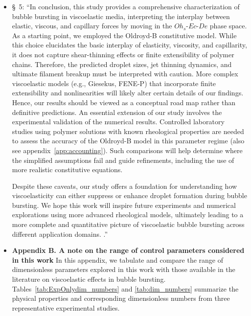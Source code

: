 \documentclass[]{article}
\newcommand{\oo}{\color{magenta} \normalfont}
\newcommand{\bb}{\color{black} \normalfont}
\begin{document}
\begin{enumerate}
\begin{enumerate}
\begin{itemize}
        \item \S~5: ``In conclusion, this study provides a comprehensive characterization of bubble bursting in viscoelastic media, interpreting the interplay between elastic, viscous, and capillary forces by moving in the $Oh_s$-$Ec$-$De$ phase space. 
        \oo
        As a starting point, we employed the Oldroyd-B constitutive model. While this choice elucidates the basic interplay of elasticity, viscosity, and capillarity, it does not capture shear-thinning effects or finite extensibility of polymer chains. Therefore, the predicted droplet sizes, jet thinning dynamics, and ultimate filament breakup must be interpreted with caution. More complex viscoelastic models (e.g., Giesekus, FENE-P) that incorporate finite extensibility and nonlinearities will likely alter certain details of our findings. Hence, our results should be viewed as a conceptual road map rather than definitive predictions. 
        An essential extension of our study involves the experimental validation of the numerical results. Controlled laboratory studies using polymer solutions with known rheological properties are needed to assess the accuracy of the Oldroyd-B model in this parameter regime (also see appendix~\ref{app:accounting}). Such comparisons will help determine where the simplified assumptions fail and guide refinements, including the use of more realistic constitutive equations.
        
        Despite these caveats, our study offers a foundation for understanding how viscoelasticity can either suppress or enhance droplet formation during bubble bursting. We hope this work will inspire future experiments and numerical explorations using more advanced rheological models, ultimately leading to a more complete and quantitative picture of viscoelastic bubble bursting across different application domains.
        \bb.''

        \item \oo
        \textbf{Appendix B. A note on the range of control parameters considered in this work}
        In this appendix, we tabulate and compare the range of dimensionless parameters explored in this work with those available in the literature on viscoelastic effects in bubble bursting. Tables~\ref{tab:ExpOnlydim_numbers} and \ref{tab:dim_numbers} summarize the physical properties and corresponding dimensionless numbers from three representative experimental studies.
        

\end{itemize}
\end{enumerate}
\end{enumerate}
\end{document}
